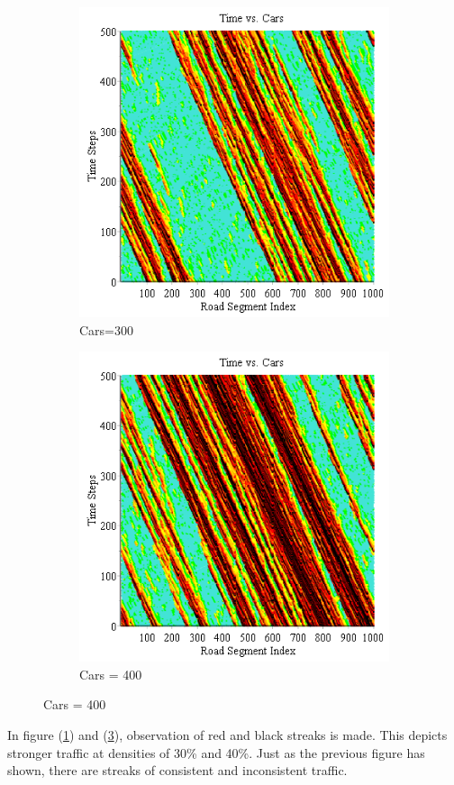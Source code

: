 \documentclass[12pt]{extarticle}
\begin{document}
\begin{figure}[h!]
	\caption{Roads = 1000, Prob = 0.05}
	\begin{subfigure}{0.50\textwidth}
		\includegraphics[scale=0.50]{Graph2.png}
		\caption{Cars=300}
		\label{fig:img2}
	\end{subfigure}
	\begin{subfigure}{0.50\textwidth}
		\includegraphics[scale=0.50]{Graph3.png}
		\caption{Cars = 400}
		\label{fig:img3}
	\end{subfigure}
\end{figure}

In figure (\ref{fig:img2}) and (\ref{fig:img3}), observation of red and black streaks is made. This depicts stronger traffic at densities of 30\% and 40\%. Just as the previous figure has shown, there are streaks of consistent and inconsistent traffic. 
\end{document}
